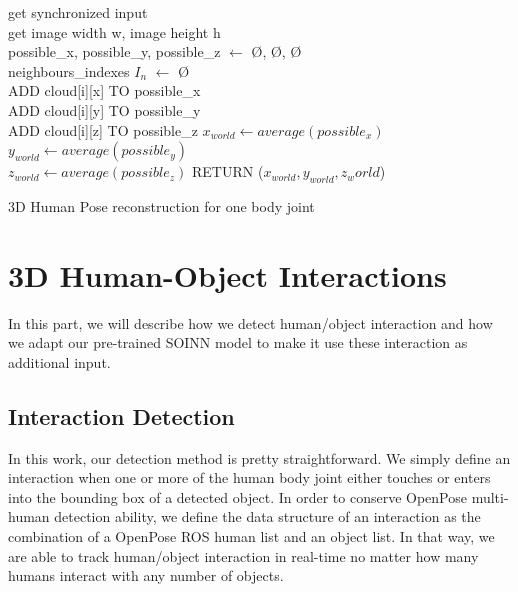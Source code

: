 \begin{algorithm}[htp]
    get synchronized input \\
    get image width w, image height h \\
    possible\_x, possible\_y, possible\_z $\leftarrow$ \O, \O, \O \\
    neighbours\_indexes $I_n$ $\leftarrow$ \O \\
    {
    {ADD cloud[i][x] TO possible\_x \\
    ADD cloud[i][y] TO possible\_y \\
    ADD cloud[i][z] TO possible\_z}
    $x_{world} \leftarrow average(possible_x)$ \\
    $y_{world} \leftarrow average(possible_y)$ \\
    $z_{world} \leftarrow average(possible_z)$}
    RETURN ($x_{world}, y_{world}, z_world$)
    \caption{3D Human Pose reconstruction for one body joint}
    \label{alg:openpose3d}
\end{algorithm}

\section{3D Human-Object Interactions}
In this part, we will describe how we detect human/object interaction and how we adapt our pre-trained SOINN model to make it use these interaction as additional input.

\subsection{Interaction Detection}
In this work, our detection method is pretty straightforward. We simply define an interaction when one or more of the human body joint either touches or enters into the bounding box of a detected object. In order to conserve OpenPose multi-human detection ability, we define the data structure of an interaction as the combination of a OpenPose ROS human list and an object list. In that way, we are able to track human/object interaction in real-time no matter how many humans interact with any number of objects.

